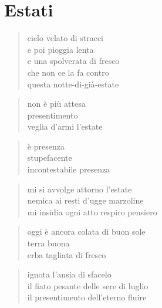 \chapter{Estati}


\begin{verse}
    cielo velato di stracci\\
    e poi pioggia lenta\\
    e una spolverata di fresco\\
    che non ce la fa contro\\
    questa notte-di-già-estate
\end{verse}

\clearpage


\begin{verse}
    non è più attesa\\
    presentimento\\
    veglia d'armi l'estate
\end{verse}

\begin{verse}
    è presenza\\
    stupefacente\\
    incontestabile presenza
\end{verse}

\clearpage


\begin{verse}
    mi si avvolge attorno l'estate\\
    nemica ai resti d'ugge marzoline\\
    mi insidia ogni atto respiro pensiero
\end{verse}

\begin{verse}
    oggi è ancora colata di buon sole\\
    terra buona\\
    erba tagliata di fresco
\end{verse}

\begin{verse}
    ignota l'ansia di sfacelo\\
    il fiato pesante delle sere di luglio\\
    il presentimento dell'eterno fluire
\end{verse}

\clearpage


